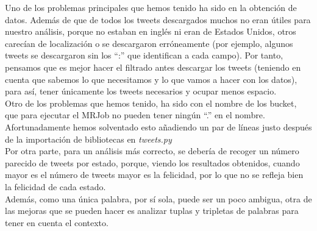 \documentclass[12pt,a4paper]{article}
\begin{document}
Uno de los problemas principales que hemos tenido ha sido en la obtención de datos. Además de que de todos los tweets descargados muchos no eran útiles para nuestro análisis, porque no estaban en inglés ni eran de Estados Unidos, otros carecían de localización o se descargaron erróneamente (por ejemplo, algunos tweets se descargaron sin los ``:'' que identifican a cada campo). Por tanto, pensamos que es mejor hacer el filtrado antes descargar los tweets (teniendo en cuenta que sabemos lo que necesitamos y lo que vamos a hacer con los datos), para así, tener únicamente los tweets necesarios y ocupar menos espacio.\\

Otro de los problemas que hemos tenido, ha sido con el nombre de los bucket, que para ejecutar el MRJob no pueden tener ningún ``.'' en el nombre. Afortunadamente hemos solventado esto añadiendo un par de líneas justo después de la importación de bibliotecas en \textit{tweets.py}\\


Por otra parte, para un análisis más correcto, se debería de recoger un número parecido de tweets por estado, porque, viendo los resultados obtenidos, cuando mayor es el número de tweets mayor es la felicidad, por lo que no se refleja bien la felicidad de cada estado.\\
Además, como una única palabra, por sí sola, puede ser un poco ambigua, otra de las mejoras que se pueden hacer es analizar tuplas y tripletas de palabras para tener en cuenta el contexto.\\
\end{document}
